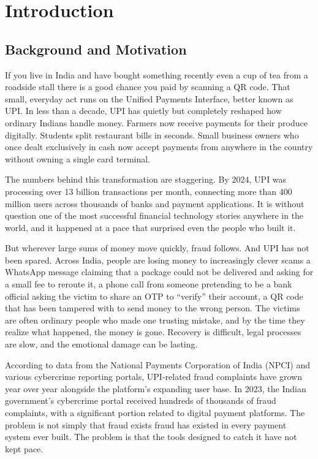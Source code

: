 \chapter{Introduction}

\section{Background and Motivation}

If you live in India and have bought something recently even a cup of tea from a roadside stall there is a good chance you paid by scanning a QR code. That small, everyday act runs on the Unified Payments Interface, better known as UPI. In less than a decade, UPI has quietly but completely reshaped how ordinary Indians handle money. Farmers now receive payments for their produce digitally. Students split restaurant bills in seconds. Small business owners who once dealt exclusively in cash now accept payments from anywhere in the country without owning a single card terminal.

The numbers behind this transformation are staggering. By 2024, UPI was processing over 13 billion transactions per month, connecting more than 400 million users across thousands of banks and payment applications. It is without question one of the most successful financial technology stories anywhere in the world, and it happened at a pace that surprised even the people who built it.

But wherever large sums of money move quickly, fraud follows. And UPI has not been spared. Across India, people are losing money to increasingly clever scams a WhatsApp message claiming that a package could not be delivered and asking for a small fee to reroute it, a phone call from someone pretending to be a bank official asking the victim to share an OTP to ``verify'' their account, a QR code that has been tampered with to send money to the wrong person. The victims are often ordinary people who made one trusting mistake, and by the time they realize what happened, the money is gone. Recovery is difficult, legal processes are slow, and the emotional damage can be lasting.

According to data from the National Payments Corporation of India (NPCI) and various cybercrime reporting portals, UPI-related fraud complaints have grown year over year alongside the platform's expanding user base. In 2023, the Indian government's cybercrime portal received hundreds of thousands of fraud complaints, with a significant portion related to digital payment platforms. The problem is not simply that fraud exists fraud has existed in every payment system ever built. The problem is that the tools designed to catch it have not kept pace.

